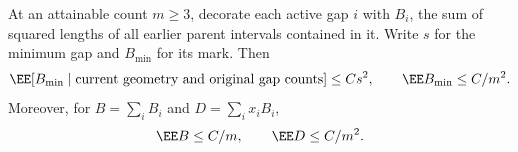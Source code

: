 \documentclass[11pt,letterpaper]{article}
\begin{document}
\begin{lemma}
\label{lem:minimum-gap-parent-mark}
At an attainable count $m\ge3$, decorate each active gap $i$
with $B_i$, the sum of squared lengths of all earlier parent
intervals contained in it. Write $s$ for the minimum gap and
$B_{\min}$ for its mark. Then
\begin{equation}\label{eq:minimum-gap-parent-mark}
 \EE[B_{\min}\mid\text{current geometry and original gap counts}]
                                     \le Cs^2,
 \qquad \EE B_{\min}\le C/m^2.
\end{equation}
Moreover, for $B=\sum_iB_i$ and $D=\sum_i x_i B_i$,
\begin{equation}\label{eq:parent-decoration-moments}
 \EE B\le C/m,\qquad \EE D\le C/m^2.
\end{equation}
\end{lemma}
\end{document}
